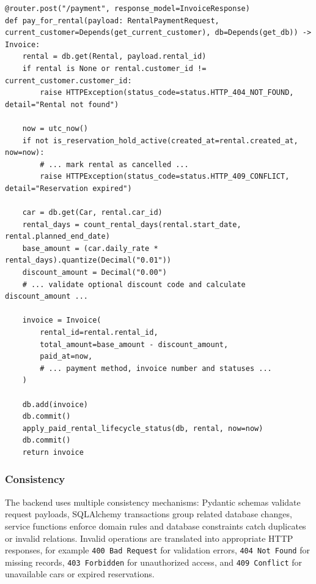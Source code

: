 \begin{lstlisting}[style=pythonstyle,caption={Payment and invoice creation},label={lst:backend-payment-short}]
@router.post("/payment", response_model=InvoiceResponse)
def pay_for_rental(payload: RentalPaymentRequest, current_customer=Depends(get_current_customer), db=Depends(get_db)) -> Invoice:
    rental = db.get(Rental, payload.rental_id)
    if rental is None or rental.customer_id != current_customer.customer_id:
        raise HTTPException(status_code=status.HTTP_404_NOT_FOUND, detail="Rental not found")

    now = utc_now()
    if not is_reservation_hold_active(created_at=rental.created_at, now=now):
        # ... mark rental as cancelled ...
        raise HTTPException(status_code=status.HTTP_409_CONFLICT, detail="Reservation expired")

    car = db.get(Car, rental.car_id)
    rental_days = count_rental_days(rental.start_date, rental.planned_end_date)
    base_amount = (car.daily_rate * rental_days).quantize(Decimal("0.01"))
    discount_amount = Decimal("0.00")
    # ... validate optional discount code and calculate discount_amount ...

    invoice = Invoice(
        rental_id=rental.rental_id,
        total_amount=base_amount - discount_amount,
        paid_at=now,
        # ... payment method, invoice number and statuses ...
    )

    db.add(invoice)
    db.commit()
    apply_paid_rental_lifecycle_status(db, rental, now=now)
    db.commit()
    return invoice
\end{lstlisting}

\subsubsection{Consistency}

The backend uses multiple consistency mechanisms: Pydantic schemas validate request payloads, SQLAlchemy transactions group related database changes, service functions enforce domain rules and database constraints catch duplicates or invalid relations. Invalid operations are translated into appropriate HTTP responses, for example \texttt{400 Bad Request} for validation errors, \texttt{404 Not Found} for missing records, \texttt{403 Forbidden} for unauthorized access, and \texttt{409 Conflict} for unavailable cars or expired reservations.
